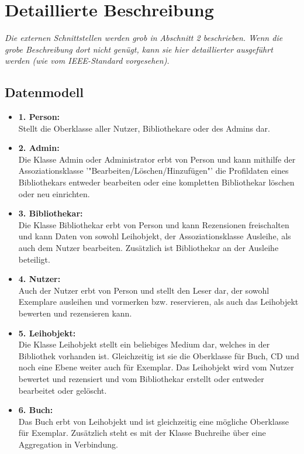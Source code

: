 \documentclass[fontsize=12pt,paper=a4,twoside]{scrartcl}
\begin{document}
\section{Detaillierte Beschreibung}
\label{ch:DetaillierteBeschreibung}
{\em Die externen Schnittstellen werden grob in Abschnitt 2
  beschrieben.  Wenn die grobe Beschreibung dort nicht genügt, kann
  sie hier detaillierter ausgeführt werden (wie vom IEEE-Standard
  vorgesehen).}

\subsection{Datenmodell}
\begin{itemize}
 \item \textbf{1. Person:}\\
  Stellt die Oberklasse aller Nutzer, Bibliothekare oder 
  des Admins dar.

\item \textbf{2. Admin:}\\
Die Klasse Admin oder Administrator erbt von Person und kann mithilfe der    Assoziationsklasse '"Bearbeiten/Löschen/Hinzufügen"' die Profildaten eines
Bibliothekars entweder bearbeiten oder eine kompletten Bibliothekar löschen 
oder  neu einrichten.
 
\item \textbf{3. Bibliothekar:}\\
Die Klasse Bibliothekar erbt von Person und kann Rezensionen freischalten und
kann Daten von sowohl Leihobjekt, der Assoziationsklasse Ausleihe, als auch 
dem Nutzer bearbeiten. Zusätzlich ist Bibliothekar an der Ausleihe beteiligt.

\item \textbf{4. Nutzer:}\\
Auch der Nutzer erbt von Person und stellt den Leser dar, der sowohl Exemplare
ausleihen und vormerken bzw. reservieren, als auch das Leihobjekt bewerten und 
rezensieren kann.

\item \textbf{5. Leihobjekt:}\\
Die Klasse Leihobjekt stellt ein beliebiges Medium dar, welches in der 
Bibliothek vorhanden ist. Gleichzeitig ist sie die Oberklasse für Buch,
CD und noch eine Ebene weiter auch für Exemplar. Das Leihobjekt wird vom Nutzer
bewertet und rezensiert und vom Bibliothekar erstellt oder entweder bearbeitet 
oder gelöscht.

\item \textbf{6. Buch:}\\
Das Buch erbt von Leihobjekt und ist gleichzeitig eine mögliche Oberklasse
für Exemplar. Zusätzlich steht es mit der Klasse Buchreihe über eine Aggregation
in Verbindung. 


\end{itemize}
\end{document}
